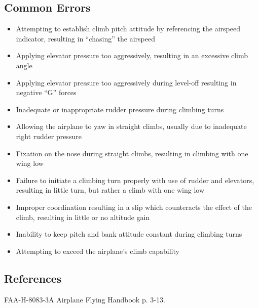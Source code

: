 \subsection{Common Errors}

\begin{itemize}
  \item Attempting to establish climb pitch attitude by referencing the
    airspeed indicator, resulting in ``chasing'' the airspeed
  \item Applying elevator pressure too aggressively, resulting in an excessive
    climb angle
  \item Applying elevator pressure too aggressively during level-off resulting
    in negative ``G'' forces
  \item Inadequate or inappropriate rudder pressure during climbing turns
  \item Allowing the airplane to yaw in straight climbs, usually due to
    inadequate right rudder pressure
  \item Fixation on the nose during straight climbs, resulting in climbing with
    one wing low
  \item Failure to initiate a climbing turn properly with use of rudder and
    elevators, resulting in little turn, but rather a climb with one wing low
  \item Improper coordination resulting in a slip which counteracts the effect
    of the climb, resulting in little or no altitude gain
  \item Inability to keep pitch and bank attitude constant during climbing
    turns
  \item Attempting to exceed the airplane's climb capability
\end{itemize}

\subsection{References}

FAA-H-8083-3A Airplane Flying Handbook p. 3-13.

